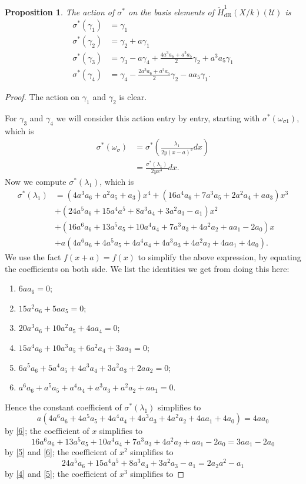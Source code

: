 \documentclass[draft, 11pt]{article} %
\theoremstyle{plain}
\newtheorem{prop}[defn]{Proposition}
\theoremstyle{remark}
\newcommand{\cU}{{\mathcal U}}
\newcommand{\cechderhamhone}{\check{H}_{\text {dR}}^1(X/k)}
\begin{document}
\begin{prop}
The action of $\sigma^*$ on the basis elements of $\cechderhamhone(\cU)$ is
\begin{align*}
\sigma^*(\gamma_1) & = \gamma_1 \\
\sigma^*(\gamma_2) & = \gamma_2 + a\gamma_1 \\
\sigma^*(\gamma_3) & = \gamma_3 - a\gamma_4 + \frac{4a^3a_6 + a^2a_5}{2}\gamma_2 + a^3a_5\gamma_1 \\
\sigma^*(\gamma_4) & =  \gamma_4 - \frac{2a^3a_6+a^2a_5}{2} \gamma_2 - aa_5\gamma_1.
\end{align*}
\end{prop}
\begin{proof}
The action on $\gamma_1$ and $\gamma_2$ is clear.

For $\gamma_3$ and $\gamma_4$ we will consider this action entry by entry, starting with $\sigma^*(\omega_{\sigma 1})$, which is
\begin{align*}
\sigma^*( \omega_{\sigma}) & = \sigma^* \left( \frac{\lambda_1}{2y(x-a)^3} dx \right) \\
& = \frac{\sigma^*(\lambda_1)}{2yx^3}dx.
\end{align*}
Now we compute $\sigma^*(\lambda_1)$, which is
\begin{align*}
\sigma^*(\lambda_1) & = (4a^3a_6+a^2a_5+a_3)x^4 + (16a^4a_6+7a^3a_5+2a^2a_4+aa_3)x^3 \\
& + (24a^5a_6+15a^4a^5+8a^3a_4+3a^2a_3-a_1)x^2 \\
& + (16a^6a_6+13a^5a_5+10a^4a_4+7a^3a_3+4a^2a_2+aa_1-2a_0)x \\
& + a(4a^6a_6+4a^5a_5+4a^4a_4+4a^3a_3+4a^2a_2+4aa_1+4a_0).
\end{align*}
We use the fact $f(x+a) = f(x)$ to simplify the above expression, by equating the coefficients on both side.
We list the identities we get from doing this here:
\begin{enumerate}
\item \label{1} $6aa_6=0$;
\item \label{2} $15a^2a_6+5aa_5 = 0$;
\item \label{3} $20a^3a_6+10a^2a_5+4aa_4 = 0$;
\item \label{4} $15a^4a_6 + 10a^3a_5 + 6a^2a_4+3aa_3= 0$;
\item \label{5} $6a^5a_6 + 5a^4a_5+4a^3a_4+3a^2a_3+2aa_2= 0$;
\item \label{6} $a^6a_6+a^5a_5+a^4a_4+a^3a_3+a^2a_2+aa_1 = 0$.
\end{enumerate}
Hence the constant coefficient of $\sigma^* (\lambda_1)$ simplifies to
\begin{equation*}
 a(4a^6a_6+4a^5a_5+4a^4a_4+4a^3a_3+4a^2a_2+4aa_1+4a_0) =  4aa_0
\end{equation*}
by \ref{6}; the coefficient of $x$ simplifies to
\[
16a^6a_6+13a^5a_5+10a^4a_4+7a^3a_3+4a^2a_2+aa_1-2a_0 = 3aa_1 -2a_0
\]
by \ref{5} and \ref{6}; the coefficient of $x^2$ simplifies to 
\[
24a^5a_6+15a^4a^5+8a^3a_4+3a^2a_3-a_1 = 2a_2a^2-a_1
\]
by \ref{4} and \ref{5}; the coefficient of $x^3$ simplifies to 


\end{proof}
\end{document}
